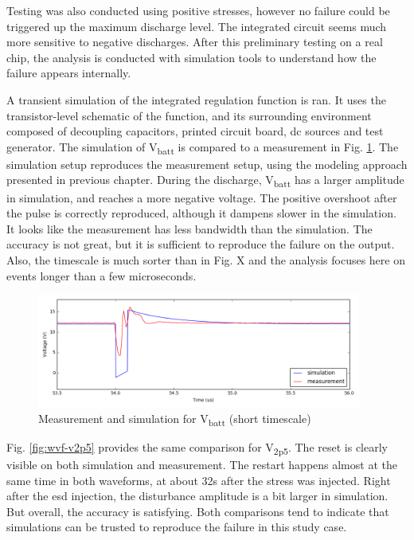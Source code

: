 Testing was also conducted using positive stresses, however no failure could be triggered up the maximum discharge level.
The integrated circuit seems much more sensitive to negative discharges.
After this preliminary testing on a real chip, the analysis is conducted with simulation tools to understand how the failure appears internally.

A transient simulation of the integrated regulation function is ran.
It uses the transistor-level schematic of the function, and its surrounding environment composed of decoupling capacitors, printed circuit board, \gls{dc} sources and test generator.
The simulation of V\textsubscript{batt} is compared to a measurement in Fig. \ref{fig:wvf-vbatt}.
The simulation setup reproduces the measurement setup, using the modeling approach presented in previous chapter.
During the discharge, V\textsubscript{batt} has a larger amplitude in simulation, and reaches a more negative voltage.
The positive overshoot after the pulse is correctly reproduced, although it dampens slower in the simulation.
It looks like the measurement has less bandwidth than the simulation.
The accuracy is not great, but it is sufficient to reproduce the failure on the output.
Also, the timescale is much sorter than in Fig. X and the analysis focuses here on events longer than a few microseconds.

\begin{figure}[!h]
  \centering
  \includegraphics[width=0.95\textwidth]{src/3/figures/vbatt.png}
  \caption{Measurement and simulation for V\textsubscript{batt} (short timescale)}
  \label{fig:wvf-vbatt}
\end{figure}

Fig. \ref{fig:wvf-v2p5} provides the same comparison for V\textsubscript{2p5}.
The reset is clearly visible on both simulation and measurement.
The restart happens almost at the same time in both waveforms, at about 32\textmu{}s after the stress was injected.
Right after the \gls{esd} injection, the disturbance amplitude is a bit larger in simulation.
But overall, the accuracy is satisfying.
Both comparisons tend to indicate that simulations can be trusted to reproduce the failure in this study case.

